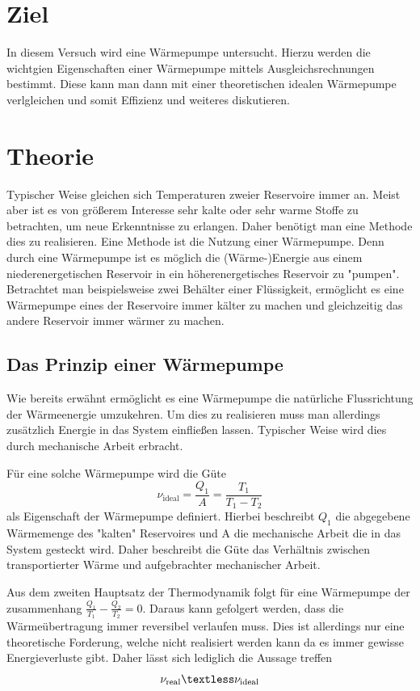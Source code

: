 \section{Ziel}
\label{sec:Theorie}
In diesem Versuch wird eine Wärmepumpe untersucht. Hierzu werden die wichtgien Eigenschaften einer Wärmepumpe mittels Ausgleichsrechnungen bestimmt. Diese kann man dann mit einer 
theoretischen idealen Wärmepumpe verlgleichen und somit Effizienz und weiteres diskutieren.
\section{Theorie}
\label{sec:Theorie}
Typischer Weise gleichen sich Temperaturen zweier Reservoire immer an. Meist aber ist es von größerem Interesse sehr kalte oder sehr warme Stoffe zu betrachten, um neue Erkenntnisse
zu erlangen. Daher benötigt man eine Methode dies zu realisieren. Eine Methode ist die Nutzung einer Wärmepumpe. Denn durch eine Wärmepumpe ist es möglich die (Wärme-)Energie aus 
einem niederenergetischen Reservoir in ein höherenergetisches Reservoir zu "pumpen". Betrachtet man beispielsweise zwei Behälter einer Flüssigkeit, ermöglicht es eine Wärmepumpe 
eines der Reservoire immer kälter zu machen und gleichzeitig das andere Reservoir immer wärmer zu machen.
\subsection{Das Prinzip einer Wärmepumpe}
\label{subsec:Prinzip}
Wie bereits erwähnt ermöglicht es eine Wärmepumpe die natürliche Flussrichtung der Wärmeenergie umzukehren. Um dies zu realisieren muss man allerdings zusätzlich Energie in das System
einfließen lassen. Typischer Weise wird dies durch mechanische Arbeit erbracht.


Für eine solche Wärmepumpe wird die Güte
\begin{equation}
    \label{eqn:Güte_ideal}
    \nu_{\text{ideal}} = \frac{Q_1}{A} = \frac{T_1}{T_1 - T_2}
\end{equation}
als Eigenschaft der Wärmepumpe definiert. Hierbei beschreibt $Q_1$ die abgegebene Wärmemenge des "kalten" Reservoires und A die mechanische Arbeit die in das System gesteckt wird.
Daher beschreibt die Güte das Verhältnis zwischen transportierter Wärme und aufgebrachter mechanischer Arbeit. 


Aus dem zweiten Hauptsatz der Thermodynamik folgt für eine Wärmepumpe der zusammenhang $\frac{Q_1}{T_1} - \frac{Q_2}{T_2} = 0$. Daraus kann gefolgert werden, dass die Wärmeübertragung 
immer reversibel verlaufen muss. Dies ist allerdings nur eine theoretische Forderung, welche nicht realisiert werden kann da es immer gewisse Energieverluste gibt. Daher lässt sich
lediglich die Aussage treffen 
\begin{equation*}
    \label{eqn:Güte_real}
    \nu_{\text{real}} \textless \nu_{\text{ideal}}
\end{equation*}

